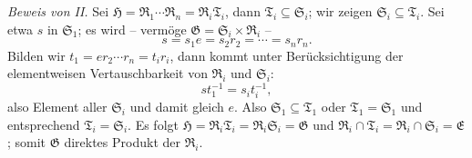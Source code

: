 \documentclass[11pt]{article}
\providecommand{\mG}{\mathfrak{G}}
\providecommand{\mE}{\mathfrak{E}}
\providecommand{\mH}{\mathfrak{H}}
\providecommand{\mR}{\mathfrak{R}}
\providecommand{\mS}{\mathfrak{S}}
\providecommand{\mT}{\mathfrak{T}}
\begin{document}
\emph{Beweis von II.} Sei $\mH=\mR_1\cdots\mR_n=\mR_i\mT_i$, dann $\mT_i\subseteq\mS_i$; wir zeigen $\mS_i\subseteq\mT_i$. Sei etwa $s$ in $\mS_1$; es wird -- vermöge $\mG=\mS_i\times\mR_i$ --
\[
        s=s_1e=s_2r_2=\cdots=s_nr_n.
\]
Bilden wir $t_1=er_2\cdots r_n=t_ir_i$, dann kommt unter Berücksichtigung der elementweisen Vertauschbarkeit von $\mR_i$ und $\mS_i$:
\[
        st_1^{-1}=s_it_i^{-1},
\]
also Element aller $\mS_i$ und damit gleich $e$. Also $\mS_1\subseteq\mT_1$ oder $\mT_1=\mS_1$ und entsprechend $\mT_i=\mS_i$. Es folgt $\mH=\mR_i\mT_i=\mR_i\mS_i=\mG$ und $\mR_i\cap\mT_i=\mR_i\cap\mS_i=\mE$; somit $\mG$ direktes Produkt der $\mR_i$.
\end{document}
